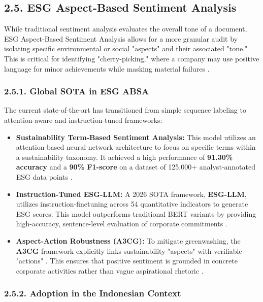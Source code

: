 \documentclass{article}
\begin{document}
\subsection*{2.5. ESG Aspect-Based Sentiment Analysis}

While traditional sentiment analysis evaluates the overall tone of a document, ESG Aspect-Based Sentiment Analysis allows for a more granular audit by isolating specific environmental or social "aspects" and their associated "tone." This is critical for identifying "cherry-picking," where a company may use positive language for minor achievements while masking material failures  \parencite{blaise_sandwidi_c58b16e0}.
\subsubsection*{2.5.1. Global SOTA in ESG ABSA}

The current state-of-the-art has transitioned from simple sequence labeling to attention-aware and instruction-tuned frameworks:
\begin{itemize}
\item 

\textbf{Sustainability Term-Based Sentiment Analysis:} This model utilizes an attention-based neural network architecture to focus on specific terms within a sustainability taxonomy. It achieved a high performance of \textbf{91.30\% accuracy} and a \textbf{90\% F1-score} on a dataset of 125,000+ analyst-annotated ESG data points  \parencite{blaise_sandwidi_c58b16e0}.\item 

\textbf{Instruction-Tuned ESG-LLM:} A 2026 SOTA framework, \textbf{ESG-LLM}, utilizes instruction-finetuning across 54 quantitative indicators to generate ESG scores. This model outperforms traditional BERT variants by providing high-accuracy, sentence-level evaluation of corporate commitments  \parencite{yawen_li_2458d4b1}.\item 

\textbf{Aspect-Action Robustness (A3CG):} To mitigate greenwashing, the \textbf{A3CG} framework explicitly links sustainability "aspects" with verifiable "actions"  \parencite{keane_ong_0a5de439}. This ensures that positive sentiment is grounded in concrete corporate activities rather than vague aspirational rhetoric  \parencite{keane_ong_369a0b63}.
\end{itemize}
\subsubsection*{2.5.2. Adoption in the Indonesian Context}
\end{document}
